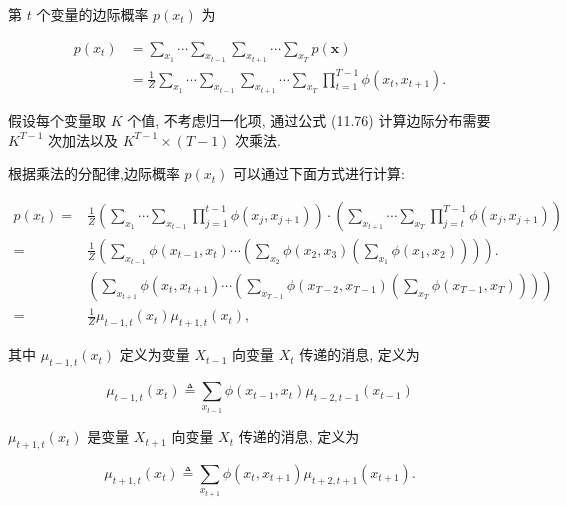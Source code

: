 \documentclass[10pt]{article}
\begin{document}
第 $t$ 个变量的边际概率 $p\left(x_{t}\right)$ 为


\begin{align*}
p\left(x_{t}\right) & =\sum_{x_{1}} \cdots \sum_{x_{t-1}} \sum_{x_{t+1}} \cdots \sum_{x_{T}} p(\boldsymbol{x})  \tag{11.75}\\
& =\frac{1}{Z} \sum_{x_{1}} \cdots \sum_{x_{t-1}} \sum_{x_{t+1}} \cdots \sum_{x_{T}} \prod_{t=1}^{T-1} \phi\left(x_{t}, x_{t+1}\right) . \tag{11.76}
\end{align*}


假设每个变量取 $K$ 个值, 不考虑归一化项, 通过公式 (11.76) 计算边际分布需要 $K^{T-1}$ 次加法以及 $K^{T-1} \times(T-1)$ 次乘法.

根据乘法的分配律,边际概率 $p\left(x_{t}\right)$ 可以通过下面方式进行计算:


\begin{align*}
p\left(x_{t}\right)= & \frac{1}{Z}\left(\sum_{x_{1}} \cdots \sum_{x_{t-1}} \prod_{j=1}^{t-1} \phi\left(x_{j}, x_{j+1}\right)\right) \cdot\left(\sum_{x_{t+1}} \cdots \sum_{x_{T}} \prod_{j=t}^{T-1} \phi\left(x_{j}, x_{j+1}\right)\right) \\
= & \frac{1}{Z}\left(\sum_{x_{t-1}} \phi\left(x_{t-1}, x_{t}\right) \cdots\left(\sum_{x_{2}} \phi\left(x_{2}, x_{3}\right)\left(\sum_{x_{1}} \phi\left(x_{1}, x_{2}\right)\right)\right)\right) . \\
& \left(\sum_{x_{t+1}} \phi\left(x_{t}, x_{t+1}\right) \cdots\left(\sum_{x_{T-1}} \phi\left(x_{T-2}, x_{T-1}\right)\left(\sum_{x_{T}} \phi\left(x_{T-1}, x_{T}\right)\right)\right)\right) \\
= & \frac{1}{Z} \mu_{t-1, t}\left(x_{t}\right) \mu_{t+1, t}\left(x_{t}\right), \tag{11.77}
\end{align*}


其中 $\mu_{t-1, t}\left(x_{t}\right)$ 定义为变量 $X_{t-1}$ 向变量 $X_{t}$ 传递的消息, 定义为


\begin{equation*}
\mu_{t-1, t}\left(x_{t}\right) \triangleq \sum_{x_{t-1}} \phi\left(x_{t-1}, x_{t}\right) \mu_{t-2, t-1}\left(x_{t-1}\right) \tag{11.78}
\end{equation*}


$\mu_{t+1, t}\left(x_{t}\right)$ 是变量 $X_{t+1}$ 向变量 $X_{t}$ 传递的消息, 定义为


\begin{equation*}
\mu_{t+1, t}\left(x_{t}\right) \triangleq \sum_{x_{t+1}} \phi\left(x_{t}, x_{t+1}\right) \mu_{t+2, t+1}\left(x_{t+1}\right) . \tag{11.79}
\end{equation*}
\end{document}
